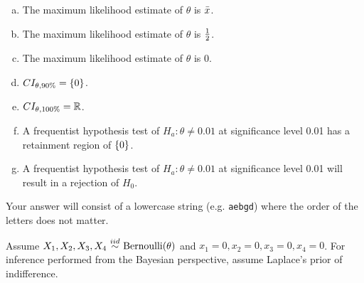 \documentclass[12pt,landscape]{article}
\newcommand{\instr}{\small Your answer will consist of a lowercase string (e.g. \texttt{aebgd}) where the order of the letters does not matter. \normalsize}
\begin{document}
\begin{enumerate}[(a)]
\item The maximum likelihood estimate of $\theta$ is $\bar{x}$.
\item The maximum likelihood estimate of $\theta$ is $\frac{1}{2}$.
\item The maximum likelihood estimate of $\theta$ is 0.
\item $CI_{\theta, 90\%} = \left\{0\right\}$.
\item $CI_{\theta, 100\%} = \mathbb{R}$.
\item A frequentist hypothesis test of $H_a: \theta \neq 0.01$ at significance level 0.01 has a retainment region of  $\left\{0\right\}$.
\item A frequentist hypothesis test of $H_a: \theta \neq 0.01$ at significance level 0.01 will result in a rejection of $H_0$.
\end{enumerate}
\eenum\instr\pagebreak


\problem{} Assume $X_1, X_2, X_3, X_4 \iid \text{Bernoulli}(\theta)$ and $x_1 = 0, x_2 = 0, x_3 = 0, x_4 = 0$. For inference performed from the Bayesian perspective, assume Laplace's prior of indifference.

\vspace{-0.2cm}\benum{} 
\end{document}

